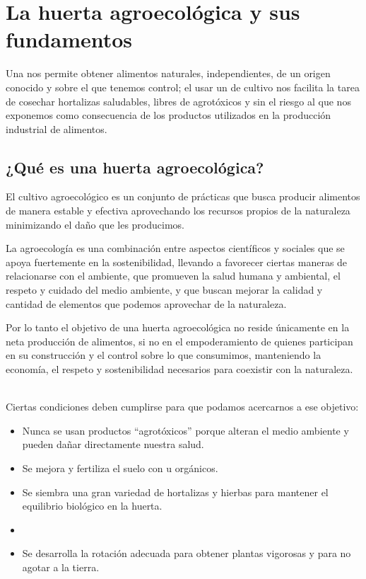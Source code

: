 \documentclass[../main.tex]{subfiles}
\begin{document}
\chapter{La huerta agroecológica y sus fundamentos}

Una  nos permite obtener alimentos naturales, independientes, de un origen conocido y sobre el que tenemos control; el usar un  de cultivo nos facilita la tarea de cosechar hortalizas saludables, libres de agrotóxicos y sin el riesgo al que nos exponemos como consecuencia de los productos utilizados en la producción industrial de alimentos. 



\section{¿Qué es una huerta agroecológica?}

El cultivo agroecológico es un conjunto de prácticas que busca producir alimentos de manera estable y efectiva aprovechando los recursos propios de la naturaleza minimizando el daño que les producimos. 

La agroecología es una combinación entre aspectos científicos y sociales que se apoya fuertemente en la sostenibilidad, llevando a favorecer ciertas maneras de relacionarse con el ambiente, que promueven la salud humana y ambiental, el respeto y cuidado del medio ambiente, y que buscan mejorar la calidad y cantidad de elementos que podemos aprovechar de la naturaleza.\\

\begin{recuadroV}
    Por lo tanto el objetivo de una huerta agroecológica no reside únicamente en la neta producción de alimentos, si no en el empoderamiento de quienes participan en su construcción y el control sobre lo que consumimos, manteniendo la economía, el respeto y sostenibilidad necesarios para coexistir con la naturaleza.
\end{recuadroV}


\hfill\\

Ciertas condiciones deben cumplirse para que podamos acercarnos a ese objetivo:\\

\begin{itemize}
    \item Nunca se usan productos “agrotóxicos” porque alteran el medio ambiente y pueden dañar directamente nuestra salud.
    \item Se mejora y fertiliza el suelo con  u orgánicos.
    \item Se siembra una gran variedad de hortalizas y hierbas para mantener el equilibrio biológico en la huerta.
    \item \color{black!50}{Se asocian los cultivos para no exigir a la tierra\\ los mismos nutrientes.} 
    \item \color{black}Se desarrolla la rotación adecuada para obtener plantas vigorosas y para no agotar a la tierra.
\end{itemize}
\end{document}

